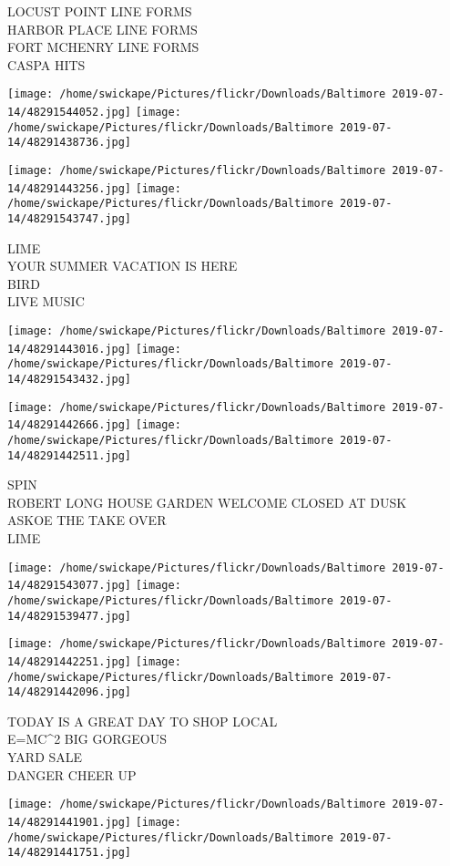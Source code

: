 \documentclass[10pt,letterpaper]{article}
\begin{document}
LOCUST POINT LINE FORMS\\
HARBOR PLACE LINE FORMS\\
FORT MCHENRY LINE FORMS\\
CASPA HITS
\pagebreak

\texttt{[image: /home/swickape/Pictures/flickr/Downloads/Baltimore 2019-07-14/48291544052.jpg]}
\texttt{[image: /home/swickape/Pictures/flickr/Downloads/Baltimore 2019-07-14/48291438736.jpg]}

\texttt{[image: /home/swickape/Pictures/flickr/Downloads/Baltimore 2019-07-14/48291443256.jpg]}
\texttt{[image: /home/swickape/Pictures/flickr/Downloads/Baltimore 2019-07-14/48291543747.jpg]}

LIME\\
YOUR SUMMER VACATION IS HERE\\
BIRD\\
LIVE MUSIC
\pagebreak

\texttt{[image: /home/swickape/Pictures/flickr/Downloads/Baltimore 2019-07-14/48291443016.jpg]}
\texttt{[image: /home/swickape/Pictures/flickr/Downloads/Baltimore 2019-07-14/48291543432.jpg]}

\texttt{[image: /home/swickape/Pictures/flickr/Downloads/Baltimore 2019-07-14/48291442666.jpg]}
\texttt{[image: /home/swickape/Pictures/flickr/Downloads/Baltimore 2019-07-14/48291442511.jpg]}

SPIN\\
ROBERT LONG HOUSE GARDEN WELCOME CLOSED AT DUSK\\
ASKOE THE TAKE OVER\\
LIME
\pagebreak

\texttt{[image: /home/swickape/Pictures/flickr/Downloads/Baltimore 2019-07-14/48291543077.jpg]}
\texttt{[image: /home/swickape/Pictures/flickr/Downloads/Baltimore 2019-07-14/48291539477.jpg]}

\texttt{[image: /home/swickape/Pictures/flickr/Downloads/Baltimore 2019-07-14/48291442251.jpg]}
\texttt{[image: /home/swickape/Pictures/flickr/Downloads/Baltimore 2019-07-14/48291442096.jpg]}

TODAY IS A GREAT DAY TO SHOP LOCAL\\
E=MC\^{}2 BIG GORGEOUS\\
YARD SALE\\
DANGER CHEER UP
\pagebreak

\texttt{[image: /home/swickape/Pictures/flickr/Downloads/Baltimore 2019-07-14/48291441901.jpg]}
\texttt{[image: /home/swickape/Pictures/flickr/Downloads/Baltimore 2019-07-14/48291441751.jpg]}
\end{document}
